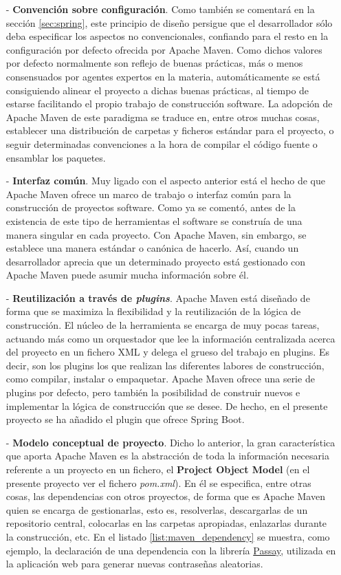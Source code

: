 \documentclass[a4paper]{article}
\begin{document}
    \begin{itemize}
    	\item[-] \textbf{Convención sobre configuración}. Como también se comentará en la sección \ref{sec:spring}, este principio de diseño persigue que el desarrollador sólo deba especificar los aspectos no convencionales, confiando para el resto en la configuración por defecto ofrecida por Apache Maven. Como dichos valores por defecto normalmente son reflejo de buenas prácticas, más o menos consensuados por agentes expertos en la materia, automáticamente se está consiguiendo alinear el proyecto a dichas buenas prácticas, al tiempo de estarse facilitando el propio trabajo de construcción software. La adopción de Apache Maven de este paradigma se traduce en, entre otros muchas cosas, establecer una distribución de carpetas y ficheros estándar para el proyecto, o seguir determinadas convenciones a la hora de compilar el código fuente o ensamblar los paquetes.
    	\item[-] \textbf{Interfaz común}. Muy ligado con el aspecto anterior está el hecho de que Apache Maven ofrece un marco de trabajo o interfaz común para la construcción de proyectos software. Como ya se comentó, antes de la existencia de este tipo de herramientas el software se construía de una manera singular en cada proyecto. Con Apache Maven, sin embargo, se establece una manera estándar o canónica de hacerlo. Así, cuando un desarrollador aprecia que un determinado proyecto está gestionado con Apache Maven puede asumir mucha información sobre él.
    	\item[-] \textbf{Reutilización a través de \emph{plugins}}. Apache Maven está diseñado de forma que se maximiza la flexibilidad y la reutilización de la lógica de construcción. El núcleo de la herramienta se encarga de muy pocas tareas, actuando más como un orquestador que lee la información centralizada acerca del proyecto en un fichero XML y delega el grueso del trabajo en plugins. Es decir, son los plugins los que realizan las diferentes labores de construcción, como compilar, instalar o empaquetar. Apache Maven ofrece una serie de plugins por defecto, pero también la posibilidad de construir nuevos e implementar la lógica de construcción que se desee. De hecho, en el presente proyecto se ha añadido el plugin que ofrece Spring Boot.
    	\item[-] \textbf{Modelo conceptual de proyecto}. Dicho lo anterior, la gran característica que aporta Apache Maven es la abstracción de toda la información necesaria referente a un proyecto en un fichero, el \textbf{Project Object Model} (en el presente proyecto ver el fichero \emph{pom.xml}). En él se especifica, entre otras cosas, las dependencias con otros proyectos, de forma que es Apache Maven quien se encarga de gestionarlas, esto es, resolverlas, descargarlas de un repositorio central, colocarlas en las carpetas apropiadas, enlazarlas durante la construcción, etc. En el listado \ref{list:maven_dependency} se muestra, como ejemplo, la declaración de una dependencia con la librería \href{https://www.passay.org/}{Passay}, utilizada en la aplicación web para generar nuevas contraseñas aleatorias. 
    \end{itemize}
    
\end{document}
